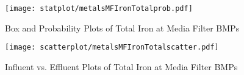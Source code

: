        \begin{figure}[hb]   %
            \centering
            \texttt{[image: statplot/metalsMFIronTotalprob.pdf]}
            \caption{Box and Probability Plots of Total Iron at Media Filter BMPs}
        \end{figure}         %
        
        
        \begin{figure}[hb]   %
            \centering
            \texttt{[image: scatterplot/metalsMFIronTotalscatter.pdf]}
            \caption{Influent vs. Effluent Plots of Total Iron at Media Filter BMPs}
        \end{figure}         %
        \clearpage
        